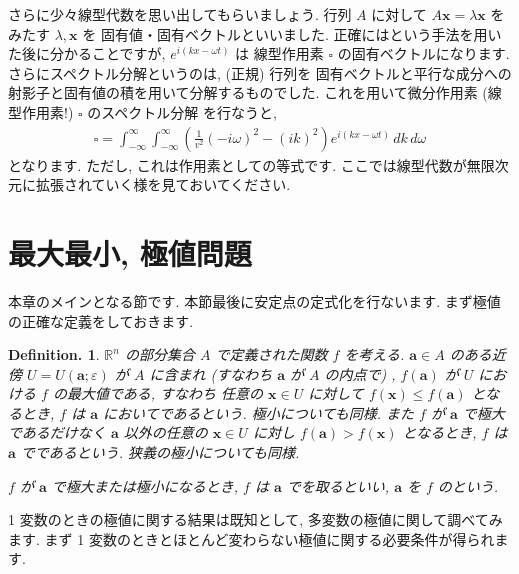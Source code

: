 \documentclass[openany, a4paper, oneside]{book}
\theoremstyle{break}
\theoremstyle{breakdefn}
\newtheorem{defn}[thm]{Definition.}
\newcommand{\bbR}{\mathbb{R}}
\newcommand{\vep}{\varepsilon}
\begin{document}
さらに少々線型代数を思い出してもらいましょう. 行列 $A$ に対して $A\bm{x}=\lambda \bm{x}$ をみたす $\lambda , \bm{x}$ を
固有値・固有ベクトルといいました.
正確にはという手法を用いた後に分かることですが,  $e^{i (kx-\omega t)}$ は
線型作用素 $\square$ の固有ベクトルになります.
さらにスペクトル分解というのは, (正規) 行列を
固有ベクトルと平行な成分への射影子と固有値の積を用いて分解するものでした.
これを用いて微分作用素 (線型作用素!) $\square$ のスペクトル分解 を行なうと,
\begin{align}
\square
=
\int _{-\infty} ^{\infty}\int _{-\infty} ^{\infty}
\left (
\frac{1} {v^2} (-i\omega )^2 - (ik) ^2
\right)
e^{i (kx - \omega t)} \, dk \, d\omega
\end{align}
となります. ただし, これは作用素としての等式です.
ここでは線型代数が無限次元に拡張されていく様を見ておいてください.
\section{最大最小, 極値問題}
\label{sec-5-2-9}

本章のメインとなる節です.
本節最後に安定点の定式化を行ないます.
まず極値の正確な定義をしておきます.
\begin{defn}
$\bbR^n$ の部分集合 $A$ で定義された関数 $f$ を考える.
$\bm{a}\in A$
のある近傍 $U=U (\bm{a}; \vep)$ が $A$ に含まれ (すなわち $\bm{a}$ が $A$ の内点で) ,
$f (\bm{a})$ が $U$ における $f$ の最大値である, すなわち
任意の $\bm{x}\in U$ に対して $f (\bm{x}) \leq f (\bm{a})$ となるとき,
$f$ は $\bm{a}$ においてであるという.
極小についても同様.
また $f$ が $\bm{a}$ で極大であるだけなく
$\bm{a}$ 以外の任意の $\bm{x} \in U$ に対し $f (\bm{a}) > f ( \bm{x} )$ となるとき,
$f$ は $\bm{a}$ でであるという.
狭義の極小についても同様.

$f$ が $\bm{a}$ で極大または極小になるとき,  $f$ は $\bm{a}$ でを取るといい,
$\bm{a}$ を $f$ のという.
\end{defn}
1 変数のときの極値に関する結果は既知として, 多変数の極値に関して調べてみます.
まず 1 変数のときとほとんど変わらない極値に関する必要条件が得られます.
\end{document}
